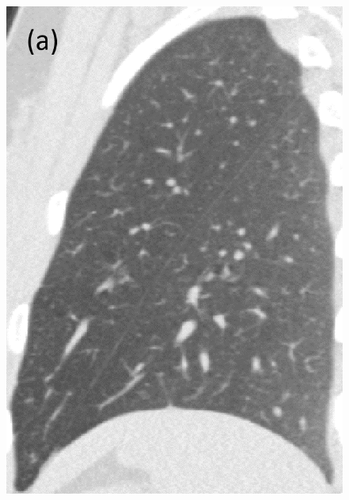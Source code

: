 \documentclass[]{spie}  %
\begin{document}
{\begin{figure}[htbp]
\begin{subfigure}
{\begin{minipage}[t]{0.15\linewidth}
  \includegraphics[width=\linewidth,trim={{.0\wd0} {.0\wd0} {.0\wd0} {.0\wd0}},clip]{Image/H1335_FRC_Raw_Sagittal.png}
  \centerline{}
	\end{minipage}%
   }%
  \label{fig:HLASegmentationResults-a} 
\end{subfigure}
\begin{subfigure}{
  \begin{minipage}[t]{0.15\linewidth}

\end{minipage}}
\end{subfigure}
\end{figure}}
\end{document}
